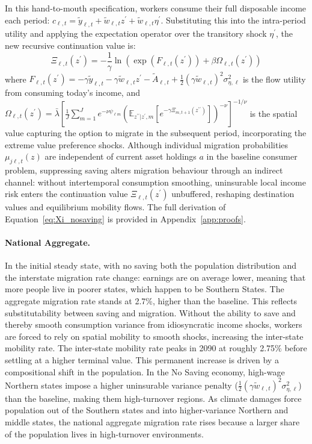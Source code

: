 \documentclass[11pt, a4paper]{article}
\begin{document}
In this hand-to-mouth specification, workers consume their full disposable income each period: $c_{\ell,t} = \tilde{y}_{\ell,t} + \tilde{w}_{\ell,t}z^\prime + \tilde{w}_{\ell,t}\eta^\prime$. Substituting this into the intra-period utility and applying the expectation operator over the transitory shock $\eta^\prime$, the new recursive continuation value is:
\begin{equation}
\Xi_{\ell,t}(z^\prime) = -\frac{1}{\gamma} \ln \left( \exp\left(F_{\ell,t}(z^\prime)\right) + \beta \Omega_{\ell,t}(z^\prime) \right)
\label{eq:Xi_nosaving}
\end{equation}
where $F_{\ell,t}(z^\prime) = -\gamma \tilde{y}_{\ell,t} - \gamma \tilde{w}_{\ell,t} z^\prime - \tilde{A}_{\ell,t} + \frac{1}{2}(\gamma \tilde{w}_{\ell,t})^2 \sigma_{\eta,\ell}^2$ is the flow utility from consuming today's income, and $\Omega_{\ell,t}(z^\prime) = \bar{\lambda} \left[ \frac{1}{J} \sum_{m=1}^J e^{-\nu \psi_{\ell m}} \left( \mathbb{E}_{z^{\prime\prime}|z^\prime, m} \left[ e^{-\gamma \Xi_{m,t+1}(z^{\prime\prime})} \right] \right)^{-\nu} \right]^{-1/\nu}$ is the spatial value capturing the option to migrate in the subsequent period, incorporating the extreme value preference shocks. Although individual migration probabilities $\mu_{j\ell,t}(z)$ are independent of current asset holdings $a$ in the baseline consumer problem, suppressing saving alters migration behaviour through an indirect channel: without intertemporal consumption smoothing, uninsurable local income risk enters the continuation value $\Xi_{\ell,t}(z^\prime)$ unbuffered, reshaping destination values and equilibrium mobility flows. The full derivation of Equation~\eqref{eq:Xi_nosaving} is provided in Appendix~\ref{app:proofs}.

\paragraph{National Aggregate.} In the initial steady state, with no saving both the population distribution and the interstate migration rate change: earnings are on average lower, meaning that more people live in poorer states, which happen to be Southern States. The aggregate migration rate stands at 2.7\%, higher than the baseline. This reflects substitutability between saving and migration. Without the ability to save and thereby smooth consumption variance from idiosyncratic income shocks, workers are forced to rely on spatial mobility to smooth shocks, increasing the inter-state mobility rate. The inter-state mobility rate peaks in 2090 at roughly 2.75\% before settling at a higher terminal value. This permanent increase is driven by a compositional shift in the population. In the No Saving economy, high-wage Northern states impose a higher uninsurable variance penalty ($\frac{1}{2}(\gamma \tilde{w}_{\ell,t})^2 \sigma_{\eta,\ell}^2$) than the baseline, making them high-turnover regions. As climate damages force population out of the Southern states and into higher-variance Northern and middle states, the national aggregate migration rate rises because a larger share of the population lives in high-turnover environments.
\end{document}
